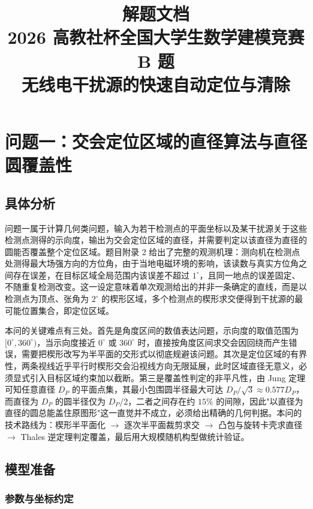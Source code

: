 \documentclass[12pt,a4paper]{ctexart}
\title{\vspace{-2cm}\textbf{\Huge 解题文档}\\[6pt]
\large 2026 高教社杯全国大学生数学建模竞赛 B 题\\[2pt]
\large 无线电干扰源的快速自动定位与清除}
\author{}
\date{}
\begin{document}
\maketitle
\vspace{-1.0cm}

\section{问题一：交会定位区域的直径算法与直径圆覆盖性}

\subsection{具体分析}

问题一属于计算几何类问题，输入为若干检测点的平面坐标以及某干扰源关于这些检测点测得的示向度，输出为交会定位区域的直径，并需要判定以该直径为直径的圆能否覆盖整个定位区域。题目附录 2 给出了完整的观测机理：测向机在检测点处测得最大场强方向的方位角，由于当地电磁环境的影响，该读数与真实方位角之间存在误差，在目标区域全局范围内该误差不超过 $1^\circ$，且同一地点的误差固定、不随重复检测改变。这一设定意味着单次观测给出的并非一条确定的直线，而是以检测点为顶点、张角为 $2^\circ$ 的楔形区域，多个检测点的楔形求交便得到干扰源的最可能位置集合，即定位区域。

本问的关键难点有三处。首先是角度区间的数值表达问题，示向度的取值范围为 $[0^\circ,360^\circ)$，当示向度接近 $0^\circ$ 或 $360^\circ$ 时，直接按角度区间求交会因回绕而产生错误，需要把楔形改写为半平面的交形式以彻底规避该问题。其次是定位区域的有界性，两条视线近乎平行时楔形交会沿视线方向无限延展，此时区域直径无意义，必须显式引入目标区域约束加以截断。第三是覆盖性判定的非平凡性，由 Jung 定理可知任意直径 $D_P$ 的平面点集，其最小包围圆半径最大可达 $D_P/\sqrt3\approx0.577D_P$，而直径为 $D_P$ 的圆半径仅为 $D_P/2$，二者之间存在约 $15\%$ 的间隙，因此"以直径为直径的圆总能盖住原图形"这一直觉并不成立，必须给出精确的几何判据。本问的技术路线为：楔形半平面化 $\rightarrow$ 逐次半平面裁剪求交 $\rightarrow$ 凸包与旋转卡壳求直径 $\rightarrow$ Thales 逆定理判定覆盖，最后用大规模随机构型做统计验证。

\subsection{模型准备}

\subsubsection{参数与坐标约定}
\end{document}
